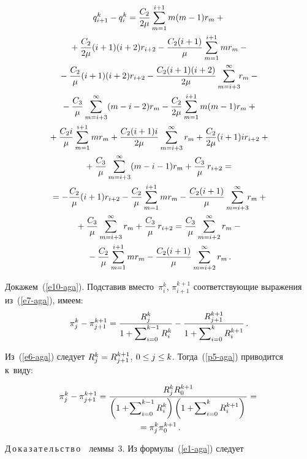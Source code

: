 \begin{multicols}{2}
{\noindent
  \begin{multline*}
  q^k_{i+1}-q_i^k= \fr{C_2}{2\mu}\sum\limits^{i+1}_{m=1} m(m-1) r_m +{}\\
  {}+
  \fr{C_2}{2\mu} (i+1) (i+2) r_{i+2} - \fr{C_2 (i+1)}
  {\mu} \sum\limits_{m=1}^{i+1} mr_m-{}\\
  {}- 
   \fr{C_2}{\mu} (i+1)(i+2) r_{i+2} -\fr{C_2(i+1)(i+2)}{2\mu} 
   \sum\limits^\infty_{m=i+3} \! \! r_m -{}\\
   {}-
   \fr{C_3}{\mu} \sum\limits^\infty_{m=i+3} (m-i-2) r_m-
  \fr{C_2}{2\mu} \sum\limits_{m=1}^{i+1} m(m-1) r_m +{}\\
  {}+\fr{C_2i}{\mu} 
\sum\limits_{m=1}^{i+1} mr_m +\fr{C_2(i+1)i}{2\mu} 
\sum\limits^\infty_{m=i+3} r_m + \fr{C_2}{2\mu}(i+1)ir_{i+2}+{}\\
  {}+
  \fr{C_3}{\mu}\sum\limits^\infty_{m=i+3} (m-i-1) 
r_m+\fr{C_3}{\mu}\,r_{i+2}={}\\
  {}=
  -\fr{C_2}{\mu} (i+1) r_{i+2} -\fr{C_2}{\mu} \sum\limits_{m=1}^{i+1} mr_m -
\fr{C_2(i+1)}{\mu}\sum\limits^\infty_{m=i+3} \!\! r_m+{}\\
  {}+
  \fr{C_3}{\mu}\sum\limits^\infty_{m=i+3} r_m +\fr{C_3}{\mu}\,r_{i+2}= 
\fr{C_3}{\mu}\sum\limits^\infty_{m=i+2} r_m -{}\\
{}-\fr{C_2}{\mu} 
\sum\limits_{m=1}^{i+1} mr_m -\fr{C_2(i+1)}{\mu} \sum\limits^\infty_{m=i+2} 
r_m\,.
  \end{multline*}
  
  Докажем~(\ref{e10-aga}). Подставив вместо~$\pi_i^k$, $\pi_{i+1}^{k+1}$ 
соответствующие выражения из~(\ref{e7-aga}), имеем: 
  \begin{equation}
  \pi_j^k-\pi_{j+1}^{k+1} =\fr{R_j^k}{1+\sum\nolimits_{i=0}^{k-1} R_i^k}- 
\fr{R_{j+1}^{k+1}}{1+\sum\nolimits^k_{i=0} R_i^{k+1}}\,.
  \label{p5-aga}
  \end{equation}
  
  Из~(\ref{e6-aga}) следует $R_j^k\hm= R_{j+1}^{k+1}$, $0\hm\leq j\hm\leq k$. 
Тогда~(\ref{p5-aga}) приводится к~виду:

\noindent
\begin{multline*}
  \pi_j^k -\pi_{j+1}^{k+1} =\fr{R_j^k R_0^{k+1}} {\left(1+ \!
\sum\nolimits_{i=0}^{k-1} R_i^k\right) 
\left(1+\!\sum\nolimits^k_{i=0} R_i^{k+1}\right)} ={}\\
{}=  
\pi_j^k \pi_0^{k+1}\,.
  \end{multline*}
  
  \vspace*{-1pt}
  
  \noindent
  Д\,о\,к\,а\,з\,а\,т\,е\,л\,ь\,с\,т\,в\,о\ \ леммы~3. Из  
формулы~(\ref{e1-aga}) следует

}
\end{multicols}
